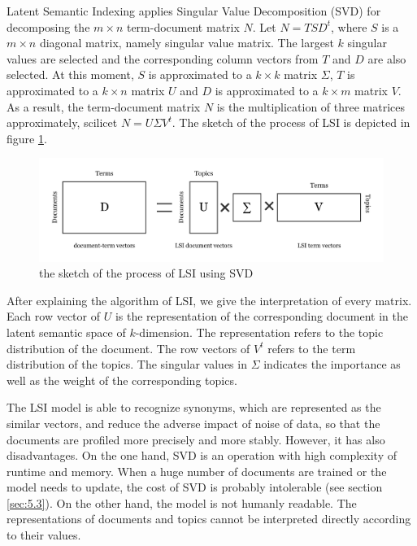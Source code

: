 Latent Semantic Indexing applies Singular Value Decomposition (SVD) for decomposing the  $m\times n$ term-document matrix $N$. Let $N=TSD^t$, where $S$ is a $m\times n$ diagonal matrix, namely singular value matrix. The largest $k$ singular values are selected and the corresponding column vectors from $T$ and $D$ are also selected. At this moment, $S$ is approximated to a $k\times k$ matrix $\Sigma$, $T$ is approximated to a $k\times n$ matrix $U$ and $D$ is approximated to a $k\times m$ matrix $V$. As a result, the term-document matrix $N$ is the multiplication of three matrices approximately, scilicet $N=U\Sigma V^t$. The sketch of the process of LSI is depicted in figure \ref{fig:svd}.

\begin{figure}[!htb]
    \centering
    \includegraphics[width=1\textwidth]{fig/SVD.pdf}
    \caption{the sketch of the process of LSI using SVD}
    \label{fig:svd}
\end{figure}

After explaining the algorithm of LSI, we give the interpretation of every matrix. Each row vector of $U$ is the representation of the corresponding document in the latent semantic space of $k$-dimension. The representation refers to the topic distribution of the document. The row vectors of $V^t$ refers to the term distribution of the topics. The singular values in $\Sigma$ indicates the importance as well as the weight of the corresponding topics. 

The LSI model is able to recognize synonyms, which are represented as the similar vectors, and reduce the adverse impact of noise of data, so that the documents are profiled more precisely and more stably. However, it has also disadvantages. On the one hand, SVD is an operation with high complexity of runtime and memory. When a huge number of documents are trained or the model needs to update, the cost of SVD is probably intolerable (see section \ref{sec:5.3}). On the other hand, the model is not humanly readable. The representations of documents and topics cannot be interpreted directly according to their values. 

